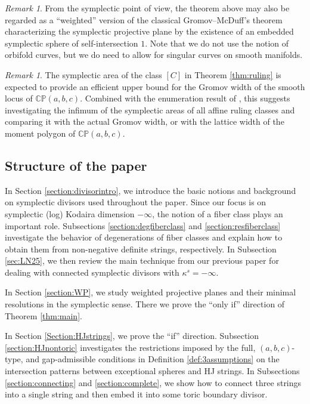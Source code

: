 \documentclass[11pt]{article}
\theoremstyle{definition}
\theoremstyle{remark}
\newtheorem{remark}[theorem]{Remark}
\newcommand{\CP}{\mathbb{CP}}
\begin{document}
\begin{remark}
  From the symplectic point of view, the theorem above may also be regarded as a ``weighted'' version of the classical Gromov--McDuff's theorem characterizing the symplectic projective plane by the existence of an embedded symplectic sphere of self-intersection $1$. Note that we do not use the notion of orbifold curves, but we do need to allow for singular curves on smooth manifolds.
\end{remark}

\begin{remark}
  The symplectic area of the class $[C]$ in Theorem \ref{thm:ruling} is expected to provide an efficient upper bound for the Gromov width of the smooth locus of $\CP(a,b,c)$. Combined with the enumeration result of \cite{DP2}, this suggests investigating the infimum of the symplectic areas of all affine ruling classes and comparing it with the actual Gromov width, or with the lattice width of the moment polygon of $\CP(a,b,c)$.
\end{remark}

\subsection{Structure of the paper}

In Section \ref{section:divisorintro}, we introduce the basic notions and background on symplectic divisors used throughout the paper. Since our focus is on symplectic (log) Kodaira dimension $-\infty$, the notion of a fiber class plays an important role. Subsections \ref{section:degfiberclass} and \ref{section:resfiberclass} investigate the behavior of degenerations of fiber classes and explain how to obtain them from non-negative definite strings, respectively. In Subsection \ref{sec:LN25}, we then review the main technique from our previous paper \cite{LN25} for dealing with connected symplectic divisors with $\kappa^s=-\infty$.

\medskip
\noindent In Section \ref{section:WP}, we study weighted projective planes and their minimal resolutions in the symplectic sense. There we prove the ``only if'' direction of Theorem \ref{thm:main}.

\medskip
\noindent In Section \ref{Section:HJstrings}, we prove the ``if'' direction. Subsection \ref{section:HJnontoric} investigates the restrictions imposed by the full, $(a,b,c)$-type, and gap-admissible conditions in Definition \ref{def:3assumptions} on the intersection patterns between exceptional spheres and HJ strings. In Subsections \ref{section:connecting} and \ref{section:complete}, we show how to connect three strings into a single string and then embed it into some toric boundary divisor.
\end{document}
